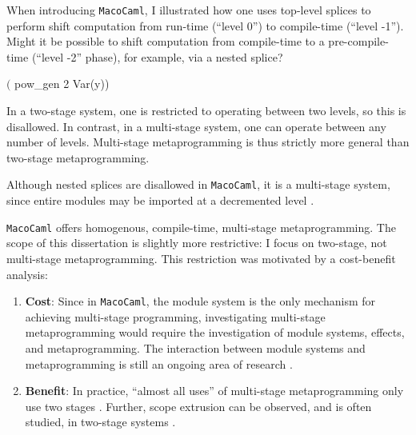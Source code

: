 \begin{enumerate}
  When introducing \texttt{MacoCaml}, I illustrated how one uses top-level splices to perform shift computation from run-time (``level 0'') to compile-time (``level -1''). Might it be possible to shift computation from compile-time to a pre-compile-time (``level -2'' phase), for example, via a nested splice?
  \begin{macocaml}
$($ pow_gen 2 Var(y))
  \end{macocaml}
  In a two-stage system, one is restricted to operating between two levels, so this is disallowed. In contrast, in a multi-stage system, one can operate between any number of levels. Multi-stage metaprogramming is thus strictly more general than two-stage metaprogramming.
  
  Although nested splices are disallowed in \texttt{MacoCaml}, it is a multi-stage system, since entire modules may be imported at a decremented level \citep{xie-2023}. 
\end{enumerate}
  
\texttt{MacoCaml} offers homogenous, compile-time, multi-stage metaprogramming. The scope of this dissertation is slightly more restrictive: I focus on two-stage, not multi-stage metaprogramming. This restriction was motivated by a cost-benefit analysis:
\begin{enumerate}
  \item \textbf{Cost}: Since in \texttt{MacoCaml}, the module system is the only mechanism for achieving multi-stage programming, investigating multi-stage metaprogramming would require the investigation of module systems, effects, and metaprogramming. The interaction between module systems and metaprogramming is still an ongoing area of research \citep{chiang-2024}.
  \item \textbf{Benefit}: In practice, ``almost all uses'' of multi-stage metaprogramming only use two stages \citep{inoue-2012}. Further, scope extrusion can be observed, and is often studied, in two-stage systems \citep{isoda-24,kiselyov-16}.
\end{enumerate}


